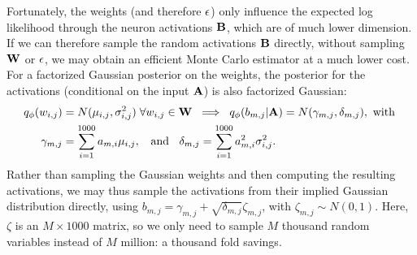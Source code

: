Fortunately, the weights (and therefore $\mathbf{\epsilon}$) only influence the expected log likelihood through the neuron activations $\mathbf{B}$, which are of much lower dimension. If we can therefore sample the random activations $\mathbf{B}$ directly, without sampling $\mathbf{W}$ or $\mathbf{\epsilon}$, we may obtain an efficient Monte Carlo estimator at a much lower cost. For a factorized Gaussian posterior on the weights, the posterior for the activations (conditional on the input $\mathbf{A}$) is also factorized Gaussian:
\begin{align}
q_\mathbf{\phi}(w_{i,j}) &= N(\mu_{i,j},\sigma^{2}_{i,j}) \hspace{0.1cm} \forall w_{i,j} \in \mathbf{W} \hspace{0.2cm} \Longrightarrow \hspace{0.2cm} q_\mathbf{\phi}(b_{m,j}|\mathbf{A}) = N(\gamma_{m,j},\delta_{m,j}), \text{ with } \nonumber\\
\gamma_{m,j} &= \sum_{i=1}^{1000} a_{m,i}\mu_{i,j}, \hspace{0.2cm} \text{ and } \hspace{0.2cm} \delta_{m,j} = \sum_{i=1}^{1000} a^{2}_{m,i}\sigma^{2}_{i,j}.
\end{align}
Rather than sampling the Gaussian weights and then computing the resulting activations, we may thus sample the activations from their implied Gaussian distribution directly, using $b_{m,j} = \gamma_{m,j} + \sqrt{\delta_{m,j}}\zeta_{m,j}$, with $\zeta_{m,j} \sim N(0,1)$. Here, $\zeta$ is an $M \times 1000$ matrix, so we only need to sample $M$ thousand random variables instead of $M$ million: a thousand fold savings.

